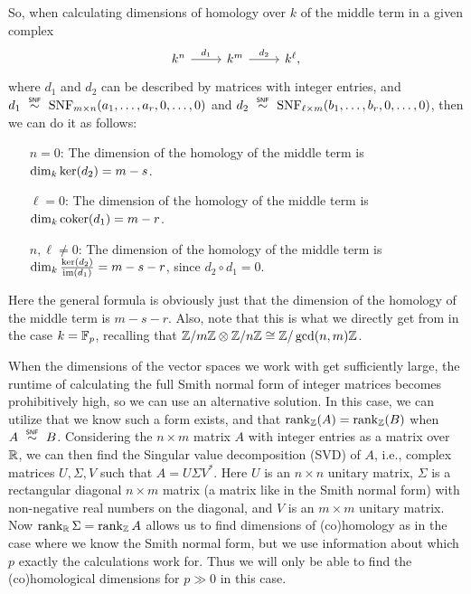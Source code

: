 So, when calculating dimensions of homology over $k$ of the middle term in a given complex
\[
  \begin{tikzcd}
    k^{n} \ar[r,"d_{1}"] & k^{m} \ar[r,"d_{2}"] & k^{\ell},
  \end{tikzcd}
\]
where $d_{1}$ and $d_{2}$ can be described by matrices with integer entries, and $d_{1} \snfsim \SNF_{m \times n}(a_{1},\dotsc,a_{r},0,\dotsc,0)$ and $d_{2} \snfsim \SNF_{\ell \times m}(b_{1},\dotsc,b_{r},0,\dotsc,0)$, then we can do it as follows:
\begin{enumerate}[align=left]
  \item[$n=0$:] The dimension of the homology of the middle term is $\dim_{k} \operatorname{ker}(d_{2}) = m-s$.
  \item[$\ell=0$:] The dimension of the homology of the middle term is $\dim_{k} \operatorname{coker}(d_{1}) = m-r$.
  \item[$n,\ell \neq 0$:] The dimension of the homology of the middle term is $\dim_{k} \frac{\operatorname{ker}(d_{2})}{\operatorname{im}(d_{1})} = m-s-r$, since $d_{2} \circ d_{1} = 0$.
\end{enumerate}

\begin{remark}
  Here the general formula is obviously just that the dimension of the homology of the middle term is $m-s-r$. Also, note that this is what we directly get from  in the case $k = \mathbb{F}_{p}$, recalling that $\mathbb{Z}/m\mathbb{Z} \otimes \mathbb{Z}/n\mathbb{Z} \cong \mathbb{Z}/\gcd(n,m)\mathbb{Z}$.
\end{remark}

\begin{remark}
  When the dimensions of the vector spaces we work with get sufficiently large, the runtime of calculating the full Smith normal form of integer matrices becomes prohibitively high, so we can use an alternative solution. In this case, we can utilize that we know such a form exists, and that $\operatorname{rank}_{\mathbb{Z}}(A) = \operatorname{rank}_{\mathbb{Z}}(B)$ when $A \snfsim B$. Considering the $n \times m$ matrix $A$ with integer entries as a matrix over $\mathbb{R}$, we can then find the Singular value decomposition (SVD) of $A$, i.e., complex matrices $U,\Sigma,V$ such that $A = U\Sigma V^{*}$. Here $U$ is an $n \times n$ unitary matrix, $\Sigma$ is a rectangular diagonal $n \times m$ matrix (a matrix like in the Smith normal form) with non-negative real numbers on the diagonal, and $V$ is an $m \times m$ unitary matrix. Now $\operatorname{rank}_{\mathbb{R}} \Sigma = \operatorname{rank}_{\mathbb{Z}} A$ allows us to find dimensions of (co)homology as in the case where we know the Smith normal form, but we use information about which $p$ exactly the calculations work for. Thus we will only be able to find the (co)homological dimensions for $p \gg 0$ in this case.
\end{remark}

